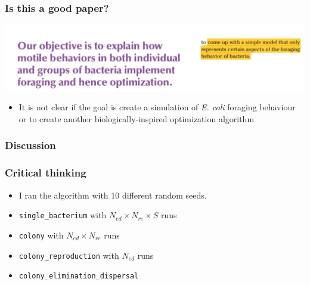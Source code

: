 \documentclass{beamer}
\begin{document}
\begin{frame}
\frametitle{Is this a good paper?}
\begin{center}
\includegraphics[scale=0.3]{assets/yikes}
\end{center}
\begin{itemize}
  \item<2-> It is not clear if the goal is create a simulation of \textit{E. coli} foraging behaviour or to create another biologically-inspired optimization algorithm
\end{itemize}
\end{frame}

\begin{frame}
\frametitle{Discussion}
\end{frame}

\begin{frame}
\frametitle{Critical thinking}
\begin{itemize}
  \item I ran the algorithm with 10 different random seeds.
  \item \texttt{single\_bacterium} with $N_{ed} \times N_{re} \times S$ runs
  \item \texttt{colony} with $N_{ed} \times N_{re}$ runs
  \item \texttt{colony\_reproduction} with $N_{ed}$ runs
  \item \texttt{colony\_elimination_dispersal}
\end{itemize}
\end{frame}
\end{document}

